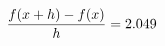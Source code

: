 \documentclass[preview]{standalone}
\begin{document}
\begin{align*}
\special{dvisvgm:raw <g id='unique000'>}\frac{f(x+h)-f(x)}{h} = 2.049\special{dvisvgm:raw </g>}
\end{align*}
\end{document}
